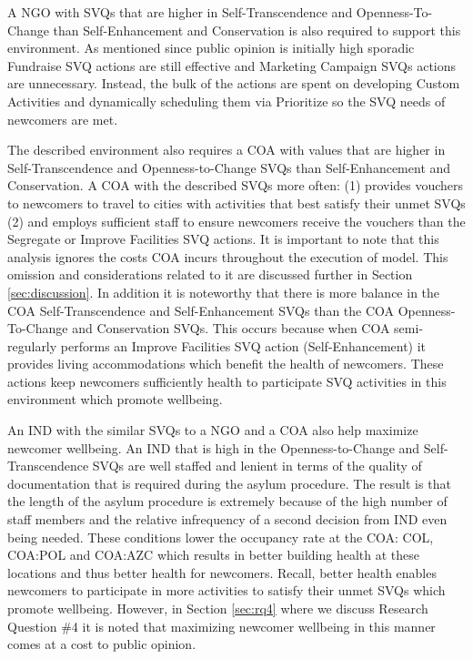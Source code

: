 \documentclass{scspaperproc}
\theoremstyle{scsthe}
\begin{document}
A NGO with SVQs that are higher in Self-Transcendence and Openness-To-Change than Self-Enhancement and Conservation is also required to support this environment. As mentioned since public opinion is initially high sporadic Fundraise SVQ actions are still effective and Marketing Campaign SVQs actions are unnecessary. Instead, the bulk of the actions are spent on developing Custom Activities and dynamically scheduling them via Prioritize so the SVQ needs of newcomers are met. 

The described environment also requires a COA with values that are higher in Self-Transcendence and Openness-to-Change SVQs than Self-Enhancement and Conservation. A COA with the described SVQs more often: (1) provides vouchers to newcomers to travel to cities with activities that best satisfy their unmet SVQs (2) and employs sufficient staff to ensure newcomers receive the vouchers than the Segregate or Improve Facilities SVQ actions. It is important to note that this analysis ignores the costs COA incurs throughout the execution of model. This omission and considerations related to it are discussed further in Section \ref{sec:discussion}. In addition it is noteworthy that there is more balance in the COA Self-Transcendence and Self-Enhancement SVQs than the COA Openness-To-Change and Conservation SVQs. This occurs because when COA semi-regularly performs an Improve Facilities SVQ action (Self-Enhancement) it provides living accommodations which benefit the health of newcomers. These actions keep newcomers sufficiently health to participate SVQ activities in this environment which promote wellbeing.  

An IND with the similar SVQs to a NGO and a COA also help maximize newcomer wellbeing. An IND that is high in the Openness-to-Change and Self-Transcendence SVQs are well staffed and lenient in terms of the quality of documentation that is required during the asylum procedure. The result is that the length of the asylum procedure is extremely because of the high number of staff members and the relative infrequency of a second decision from IND even being needed. These conditions lower the occupancy rate at the COA: COL, COA:POL and COA:AZC which results in better building health at these locations and thus better health for newcomers. Recall, better health enables newcomers to participate in more activities to satisfy their unmet SVQs which promote wellbeing. However, in Section \ref{sec:rq4} where we discuss Research Question \#4 it is noted that maximizing newcomer wellbeing in this manner comes at a cost to public opinion. 
\end{document}
